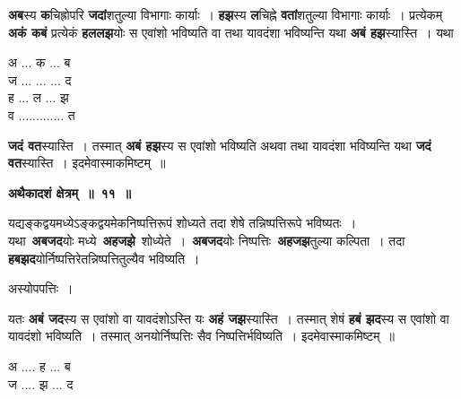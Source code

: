 \documentclass[11pt, openany]{book}
\begin{document}
\begin{flushleft}
\begin{minipage}[t]{0.64\textwidth}
\hspace{4mm} \textbf{अब}स्य \textbf{क}चिह्रोपरि \textbf{जदां}शतुल्या विभागाः कार्याः~। \textbf{हझ}स्य \textbf{ल}चिह्ने \textbf{वतां}शतुल्या विभागाः कार्याः~। प्रत्येकम् \textbf{अकं कबं} प्रत्येकं \textbf{हललझ}योः स एवांशो भविष्यति वा तथा यावदंशा भविष्यन्ति यथा \textbf{अबं हझ}स्यास्ति~। यथा
\end{minipage} 
\hfill
\begin{minipage}[t]{0.26\textwidth}
अ ... क ... ब\\
ज ... ... ... द\\
ह ... ल ... झ\\
व ............. त
\end{minipage}
\end{flushleft}
\vspace{-3mm}

\noindent \textbf{जदं वत}स्यास्ति~। तस्मात् \textbf{अबं हझ}स्य स एवांशो भविष्यति अथवा तथा यावदंशा भविष्यन्ति यथा \textbf{जदं वत}स्यास्ति~। इदमेवास्माकमिष्टम्~॥
\vspace{2mm}

\begin{center}
\textbf{\large अथैकादशं क्षेत्रम्~॥~११~॥}
\end{center}

{\ab यद्यङ्कद्वयमध्येऽङ्कद्वयमेकनिष्पत्तिरूपं \;शोध्यते \;तदा \;शेषे \;तन्निष्पत्तिरूपे भविष्यतः~। }\\

 यथा \,\textbf{अबजद}योः मध्ये \,\textbf{अहजझे} \,शोध्येते~। \,\textbf{अबजद}योः निष्पत्तिः \,\textbf{अहजझ}तुल्या कल्पिता~। तदा \textbf{हबझद}योर्निष्पत्तिरेतन्निष्पत्तितुल्यैव भविष्यति~।
 
\begin{center}
अस्योपपत्तिः~।
\end{center}
 
\begin{flushleft}
\begin{minipage}[t]{0.64\textwidth}
\hspace{4mm}  यतः \textbf{अबं जद}स्य स एवांशो वा यावदंशोऽस्ति यः \textbf{अहं जझ}स्यास्ति~। तस्मात् शेषं \textbf{हबं झद}स्य स एवांशो वा यावदंशो भविष्यति~। तस्मात् अनयोर्निष्पत्तिः सैव निष्पत्तिर्भविष्यति~। इदमेवास्माकमिष्टम्~॥
\end{minipage} 
\hfill
\begin{minipage}[t]{0.25\textwidth}
अ .... ह ... ब\\
ज .... झ ... द
\end{minipage}
\end{flushleft}
\end{document}
